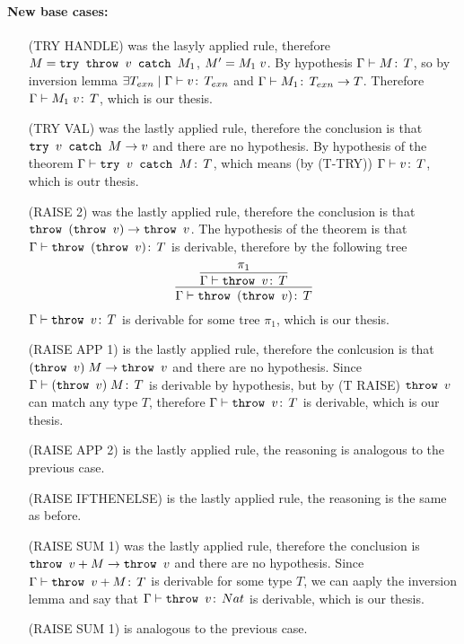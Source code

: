 \paragraph*{New base cases:\\}
\begin{itemize}
\item[(TRY HANDLE)] was the lasyly applied rule, therefore \(M =
  \texttt{try }\texttt{throw }v\texttt{ catch }M_1\), \(M' = M_1\;v\). By hypothesis
  \(\Gamma \vdash M \!:\,T\), so by inversion lemma \(\exists
  T_{exn} \mid \Gamma \vdash v \!:\,T_{exn}\) and \(\Gamma \vdash
  M_1 \!:\,T_{exn} \to T\). Therefore \(\Gamma \vdash M_1\;v
  \!:\,T\), which is our thesis.
\item[(TRY VAL)] was the lastly applied rule, therefore the conclusion
  is that \(\texttt{try }v\texttt{ catch }M \to v\) and there are no hypothesis. By
  hypothesis of the theorem \(\Gamma\vdash \texttt{try }v\texttt{ catch }M\!:\,T\), which
  means (by (T-TRY)) \(\Gamma\vdash v \!:\,T\), which is outr
  thesis.
\item[(RAISE 2)] was the lastly applied rule, therefore the conclusion
  is that \(\texttt{throw }(\texttt{throw }v) \to \texttt{throw }v\). The hypothesis of the
  theorem is that \(\Gamma\vdash \texttt{throw }(\texttt{throw }v) \!:\,T\) is
  derivable, therefore by the following tree \[\infer{\Gamma\vdash
    \THROW{(\THROW{v})} \TYPE{T}}{\infer{\Gamma\vdash \THROW{v}
      \TYPE{T}}{\pi_1}}\] \(\Gamma\vdash \texttt{throw }v \!:\,T\) is
  derivable for some tree \(\pi_1\), which is our thesis.
\item[(RAISE APP 1)] is the lastly applied rule, therefore the
  conlcusion is that \((\texttt{throw }v)\;M \to \texttt{throw }v\) and there
  are no hypothesis. Since \(\Gamma\vdash (\texttt{throw }v)\;M
  \!:\,T\) is derivable by hypothesis, but by (T RAISE)
  \(\texttt{throw }v\) can match any type \(T\), therefore \(\Gamma \vdash
  \texttt{throw }v \!:\,T\) is derivable, which is our thesis.
\item[(RAISE APP 2)] is the lastly applied rule, the reasoning is
  analogous to the previous case.
\item[(RAISE IFTHENELSE)] is the lastly applied rule, the reasoning is
  the same as before.
\item[(RAISE SUM 1)] was the lastly applied rule, therefore the
  conclusion is \(\texttt{throw }v + M \to \texttt{throw }v\) and there are no
  hypothesis. Since \(\Gamma \vdash \texttt{throw }v + M \!:\,T\) is
  derivable for some type \(T\), we can aaply the inversion lemma and
  say that \(\Gamma \vdash \texttt{throw }v\!:\,Nat\) is derivable, which
  is our thesis.
\item[(RAISE SUM 1)] is analogous to the previous case.
\end{itemize}

